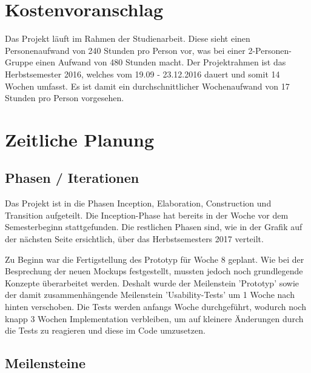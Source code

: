 
 \section{Kostenvoranschlag}
 Das Projekt läuft im Rahmen der Studienarbeit. Diese sieht einen Personenaufwand von 240 Stunden pro Person vor, was bei einer 2-Personen-Gruppe einen Aufwand von 480 Stunden macht. 
 Der Projektrahmen ist das Herbstsemester 2016, welches vom 19.09 - 23.12.2016 dauert und somit 14 Wochen umfasst. Es ist damit ein durchschnittlicher Wochenaufwand von 17 Stunden pro Person vorgesehen.
 
 
 \section{Zeitliche Planung}
 
 \subsection{Phasen / Iterationen}
 Das Projekt ist in die Phasen Inception, Elaboration, Construction und Transition aufgeteilt. Die Inception-Phase hat bereits in der Woche vor dem Semesterbeginn stattgefunden. Die restlichen Phasen sind, wie in der Grafik auf der nächsten Seite ersichtlich, über das Herbstsemesters 2017 verteilt.
 
 Zu Beginn war die Fertigstellung des Prototyp für Woche 8 geplant. Wie bei der Besprechung der neuen Mockups festgestellt, mussten jedoch noch grundlegende Konzepte überarbeitet werden. Deshalt wurde der Meilenstein 'Prototyp' sowie der damit zusammenhängende Meilenstein 'Usability-Tests' um 1 Woche nach hinten verschoben. Die Tests werden anfangs Woche durchgeführt, wodurch noch knapp 3 Wochen Implementation verbleiben, um auf kleinere Änderungen durch die Tests zu reagieren und diese im Code umzusetzen.
 



 
 
 \subsection{Meilensteine}
 
